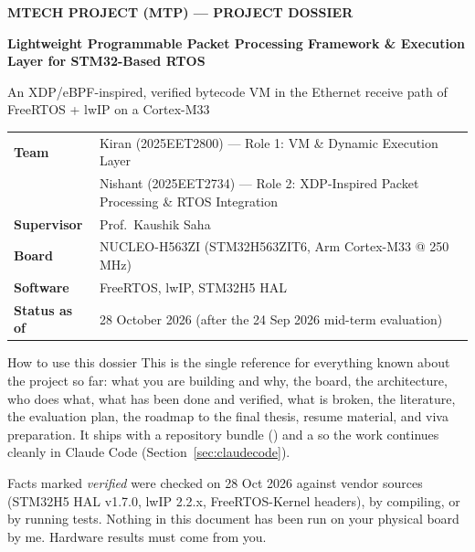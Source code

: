\documentclass[10pt,a4paper]{article}
\begin{document}
\thispagestyle{empty}
\vspace*{1.2cm}
{\sffamily\color{accent}\small\bfseries MTECH PROJECT (MTP) --- PROJECT DOSSIER\par}
\vspace{6pt}
{\raggedright\sffamily\bfseries\fontsize{21}{26}\selectfont Lightweight Programmable Packet Processing Framework \& Execution Layer for STM32-Based RTOS\par}
\vspace{10pt}
{\large An XDP/eBPF-inspired, verified bytecode VM in the Ethernet receive path of FreeRTOS + lwIP on a Cortex-M33\par}
\vspace{16pt}
\begin{tabularx}{\textwidth}{@{}P{3.3cm}L@{}}
\toprule
\textsf{\textbf{Team}} & Kiran (2025EET2800) --- Role 1: VM \& Dynamic Execution Layer \\
 & Nishant (2025EET2734) --- Role 2: XDP-Inspired Packet Processing \& RTOS Integration \\
\textsf{\textbf{Supervisor}} & Prof.\ Kaushik Saha \\
\textsf{\textbf{Board}} & NUCLEO-H563ZI (STM32H563ZIT6, Arm Cortex-M33 @ 250\,MHz) \\
\textsf{\textbf{Software}} & FreeRTOS, lwIP, STM32H5 HAL \\
\textsf{\textbf{Status as of}} & 28 October 2026 (after the 24 Sep 2026 mid-term evaluation) \\
\bottomrule
\end{tabularx}

\vspace{14pt}
\begin{keybox}{How to use this dossier}
This is the single reference for everything known about the project so far: what you are building and why, the board, the architecture, who does what, what has been done and verified, what is broken, the literature, the evaluation plan, the roadmap to the final thesis, resume material, and viva preparation. It ships with a repository bundle () and a  so the work continues cleanly in Claude Code (Section~\ref{sec:claudecode}).

Facts marked \emph{verified} were checked on 28 Oct 2026 against vendor sources (STM32H5 HAL v1.7.0, lwIP 2.2.x, FreeRTOS-Kernel headers), by compiling, or by running tests. Nothing in this document has been run on your physical board by me. Hardware results must come from you.
\end{keybox}
\end{document}
